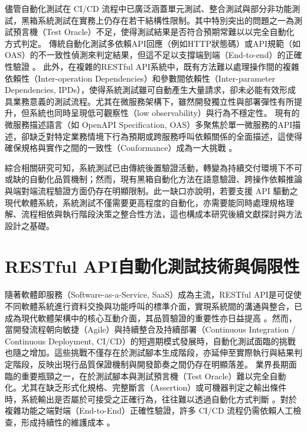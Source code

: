 \begin{ZhChapter}
\text 儘管自動化測試在 CI/CD 流程中已廣泛涵蓋單元測試、整合測試與部分非功能測試，黑箱系統測試在實務上仍存在若干結構性限制。其中特別突出的問題之一為測試預言機（Test Oracle）不足，使得測試結果是否符合預期常難以以完全自動化方式判定\parencite{Anonymous2025GenAIRoles, Golmohammadi2024Testing, Navarro2026Automatic}。
\text 傳統自動化測試多依賴API回應（例如HTTP狀態碼）或API規範（如 OAS）的不一致性偵測來判定結果，但這不足以支撐端到端（End-to-end）的正確性驗證 \parencite{Alonso2023ARTE, OracleProblemSurvey}。
\text 此外，在複雜的RESTful API系統中，既有方法難以處理操作間的複雜依賴性（Inter-operation Dependencies）和參數間依賴性（Inter-parameter Dependencies, IPDs）\parencite{Nguyen2024KAT, Kim2025LlamaRestTest}，使得系統測試雖可自動產生大量請求，卻未必能有效形成具業務意義的測試流程。尤其在微服務架構下，雖然開發獨立性與部署彈性有所提升，但系統也同時呈現低可觀察性（low observability）與行為不穩定性。
\text 現有的微服務描述語言（如 OpenAPI Specification, OAS）多聚焦於單一微服務的API描述，卻缺乏對特定業務情境下行為預期或跨服務呼叫依賴關係的全面描述，這使得確保規格與實作之間的一致性（Conformance）成為一大挑戰 \parencite{Sun2024Detecting}。

\text 綜合相關研究可知，系統測試已由傳統後置驗證活動，轉變為持續交付環境下不可或缺的自動化品質機制；然而，現有黑箱自動化方法在語意驗證、跨操作依賴推論與端對端流程驗證方面仍存在明顯限制。此一缺口亦說明，若要支援 API 驅動之現代軟體系統，系統測試不僅需要更高程度的自動化，亦需要能同時處理規格理解、流程相依與執行階段決策之整合性方法，這也構成本研究後續文獻探討與方法設計之基礎。

\section{RESTful API自動化測試技術與侷限性}
\text 隨著軟體即服務（Software-as-a-Service, SaaS）成為主流，RESTful API是可促使不同軟體系統進行資料交換與功能呼叫的標準介面，實現系統間的溝通與整合，已成為現代軟體架構中的核心互動介面，其品質驗證的重要性亦日益提高 \parencite{Wang2020AutomaticGeneration, yu2025rag}。然而，當開發流程朝向敏捷（Agile）與持續整合及持續部署（Continuous Integration / Continuous Deployment, CI/CD）的短週期模式發展時，自動化測試面臨的挑戰也隨之增加。這些挑戰不僅存在於測試腳本生成階段，亦延伸至實際執行與結果判定階段，反映出現行品質保證機制與開發節奏之間仍存在明顯落差。
\text 業界長期面臨的重要瓶頸之一，在於測試腳本與測試預言機（Test Oracle）難以完全自動化。尤其在缺乏形式化規格、完整斷言（Assertion）或可機器判定之輸出條件時，系統輸出是否屬於可接受之正確行為，往往難以透過自動化方式判斷 \parencite{OracleProblemSurvey}。對於複雜功能之端對端（End-to-End）正確性驗證，許多 CI/CD 流程仍需依賴人工檢查，形成持續性的維護成本 \parencite{Wang2020AutomaticGeneration}。


\end{ZhChapter}
